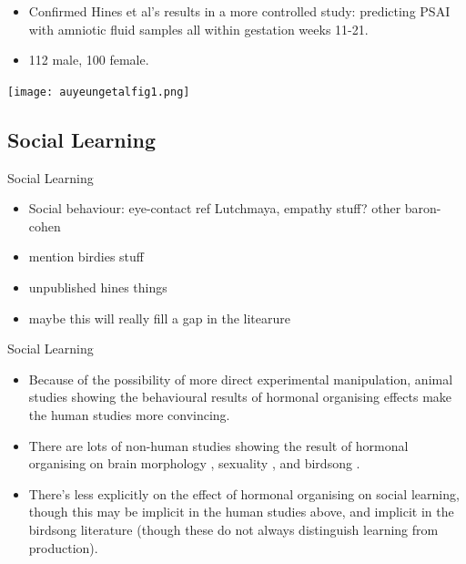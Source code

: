 \documentclass[hyperref={pdfpagelabels=false}]{beamer}
\begin{document}
\begin{frame}{\citet{auyeungetal2009}}
\begin{itemize}
	\item Confirmed Hines et al's results in a more controlled study: predicting PSAI with amniotic fluid samples all within gestation weeks 11-21.
	\item 112 male, 100 female.
	\end{itemize}

\end{frame}

\begin{frame}{\citet{auyeungetal2009}}

\begin{center}
	\texttt{[image: auyeungetalfig1.png]}
\end{center}

\end{frame}

\subsection{Social Learning}

\begin{frame}{Social Learning}
\begin{itemize}
	\item Social behaviour: eye-contact ref Lutchmaya, empathy stuff? other baron-cohen
	\item mention birdies stuff

	\item unpublished hines things
	\item maybe this will really fill a gap in the litearure
\end{itemize}

\end{frame}

\begin{frame}{Social Learning}
\begin{itemize}
	\item Because of the possibility of more direct experimental manipulation, animal studies showing the behavioural results of hormonal organising effects make the human studies more convincing.
	\item There are lots of non-human studies showing the result of hormonal organising on brain morphology \citep[e.g. in rats, going back to][]{gorski1978}, sexuality \citep[many references in][Chapts. 3-4]{balthazart2011}, and birdsong \citep[see][for an overview]{balthazartetal2009}.
	\item There's less explicitly on the effect of hormonal organising on social learning, though this may be implicit in the human studies above, and implicit in the birdsong literature (though these do not always distinguish learning from production).
\end{itemize}

\end{frame}
\end{document}
